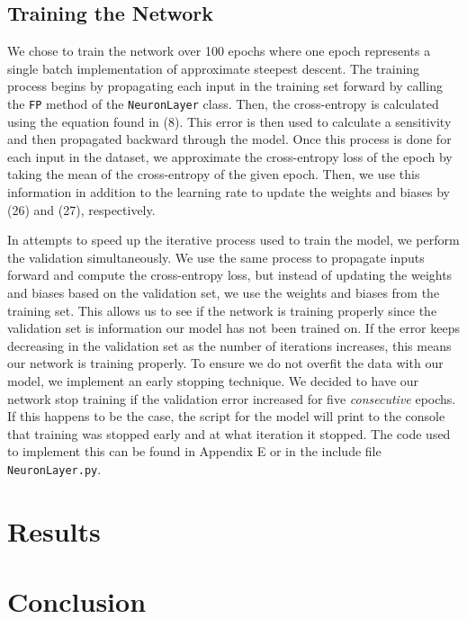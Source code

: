 \documentclass[12pt,halfline,a4paper]{ouparticle}
\begin{document}
\subsection{Training the Network}
We chose to train the network over 100 epochs where one epoch represents a single batch implementation of approximate steepest descent. The training process begins by propagating each input in the training set forward by calling the \verb|FP| method of the \verb|NeuronLayer| class. Then, the cross-entropy is calculated using the equation found in (8). This error is then used to calculate a sensitivity and then propagated backward through the model. Once this process is done for each input in the dataset, we approximate the cross-entropy loss of the epoch by taking the mean of the cross-entropy of the given epoch. Then, we use this information in addition to the learning rate to update the weights and biases by (26) and (27), respectively. 

In attempts to speed up the iterative process used to train the model, we perform the validation simultaneously.  We use the same process to propagate inputs forward and compute the cross-entropy loss, but instead of updating the weights and biases based on the validation set, we use the weights and biases from the training set. This allows us to see if the network is training properly since the validation set is information our model has not been trained on. If the error keeps decreasing in the validation set as the number of iterations increases, this means our network is training properly. To ensure we do not overfit the data with our model, we implement an early stopping technique. We decided to have our network stop training if the validation error increased for five \emph{consecutive} epochs. If this happens to be the case, the script for the model will print to the console that training was stopped early and at what iteration it stopped. The code used to implement this can be found in Appendix E or in the include file \verb|NeuronLayer.py|.  



\section{Results}
\label{sec6}

\section{Conclusion}
\label{sec7}
\end{document}
